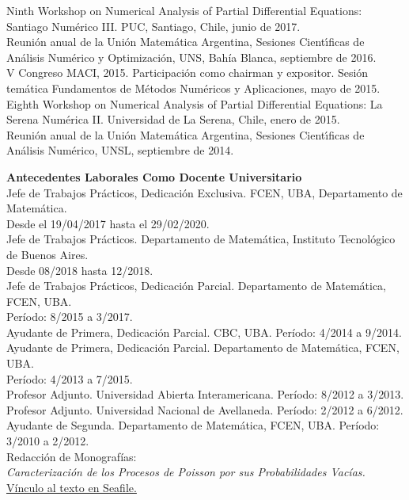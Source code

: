 Ninth Workshop on Numerical Analysis of Partial Differential Equations: Santiago Num\'erico III.
PUC, Santiago, Chile, junio de
2017.\\[4pt]

Reuni\'on anual de la Uni\'on Matem\'atica Argentina, Sesiones Cient\'{\i}ficas
de An\'alisis Num\'erico y Optimizaci\'on, UNS, Bah\'ia Blanca, septiembre de 2016.\\[4pt]

V Congreso MACI, 2015. Participaci\'on como 
chairman y expositor. Sesi\'on tem\'atica Fundamentos de M\'etodos 
Num\'ericos y Aplicaciones, mayo
de 2015.\\[4pt]

Eighth Workshop on Numerical Analysis of Partial Differential Equations: La Serena Num\'erica II.
Universidad de La Serena, Chile, enero de 
2015.\\[4pt]

Reuni\'on anual de la Uni\'on Matem\'atica Argentina, Sesiones Cient\'{\i}ficas
de An\'alisis Num\'erico, UNSL, septiembre de 2014.

\textbf{Antecedentes Laborales Como Docente Universitario}\\[6pt]
Jefe de Trabajos Pr\'acticos, Dedicaci\'on Exclusiva. FCEN, UBA, 
Departamento de Matem\'atica.\\Desde el 19/04/2017 hasta el 29/02/2020.\\[4pt]
Jefe de Trabajos Pr\'acticos. Departamento de Matem\'atica, 
Instituto Tecnol\'ogico de Buenos Aires.\\Desde 08/2018 hasta 12/2018.\\[4pt]
Jefe de Trabajos Pr\'acticos, Dedicaci\'on Parcial. Departamento de Matem\'atica, FCEN, UBA.\\
Per\'iodo: 8/2015 a 3/2017.\\[4pt]
Ayudante de Primera, Dedicaci\'on Parcial. CBC, UBA. Per\'iodo: 4/2014 a 9/2014.\\[4pt]
Ayudante de Primera, Dedicaci\'on Parcial. Departamento de Matem\'atica, FCEN, UBA.\\
Per\'iodo: 4/2013 a 7/2015.\\[4pt]
Profesor Adjunto. Universidad Abierta Interamericana.
Per\'iodo: 8/2012 a 3/2013.\\[4pt]
Profesor Adjunto. Universidad Nacional de Avellaneda.
Per\'iodo: 2/2012 a 6/2012.\\[4pt]
Ayudante de Segunda. Departamento de Matem\'atica, FCEN, UBA. Per\'iodo: 3/2010 a 2/2012.\\[6pt]
Redacci\'on de Monograf\'ias:\\[6pt]
\emph{Caracterizaci\'on de los Procesos de Poisson por sus Probabilidades Vac\'ias.} 
\href{https://nube.dm.uba.ar/f/c4aa2335cb/}{\color{blue}V\'inculo al texto en Seafile.}


